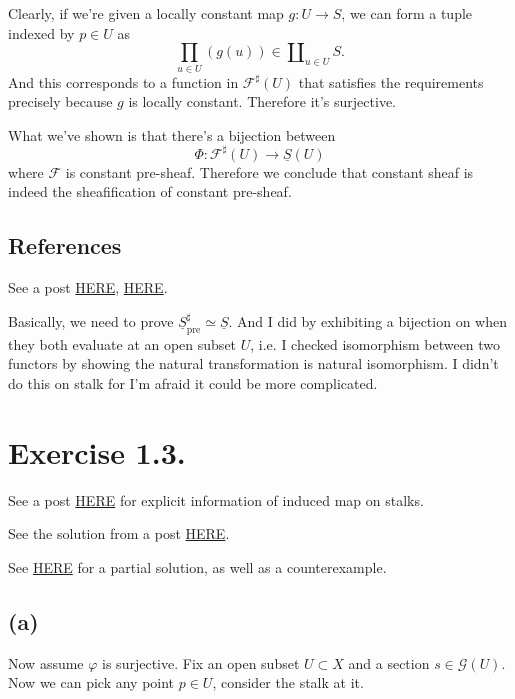 Clearly, if we're given a locally constant map $g:U\to S$, we can form a tuple indexed by $p\in U$ as
\[\prod_{u\in U} (g(u))\in \amalg_{u\in U}S.\] And this corresponds to a function in $\mathscr F^{\sharp}(U)$ that satisfies the requirements precisely because $g$ is locally constant. Therefore it's surjective.

What we've shown is that there's a bijection between 
\[\Phi:\mathscr F^{\sharp}(U)\to\underline{S}(U)\] where $\mathscr F$ is constant pre-sheaf. Therefore we conclude that constant sheaf is indeed the sheafification of constant pre-sheaf.

\subsection{References}

See a post \href{https://math.stackexchange.com/questions/249961/sheafification-of-the-constant-presheaf}{HERE}, \href{https://math.stackexchange.com/questions/3834390/sheafification-of-constant-presheaf}{HERE}.

Basically, we need to prove $\underline{S}_{\text{pre}}^{\sharp}\simeq \underline{S}$. And I did by exhibiting a bijection on when they both evaluate at an open subset $U$, i.e. I checked isomorphism between two functors by showing the natural transformation is natural isomorphism.
I didn't do this on stalk for I'm afraid it could be more complicated.

\section{Exercise 1.3.}

See a post \href{https://math.stackexchange.com/questions/1387214/the-induced-map-on-stalks-is-well-defined}{HERE} for explicit information of induced map on stalks. 

See the solution from a post \href{https://math.stackexchange.com/questions/4450406/surjective-morphism-of-sheaves}{HERE}.

See \href{https://www.math.arizona.edu/~cais/CourseNotes/AlgGeom04/Hartshorne_Solutions.pdf}{HERE} for a partial solution, as well as a counterexample. 
\subsection{(a)}

Now assume $\varphi$ is surjective. Fix an open subset $U\subset X$ and a section $s\in\mathscr G(U)$. Now we can pick any point $p\in U$, consider the stalk at it.


